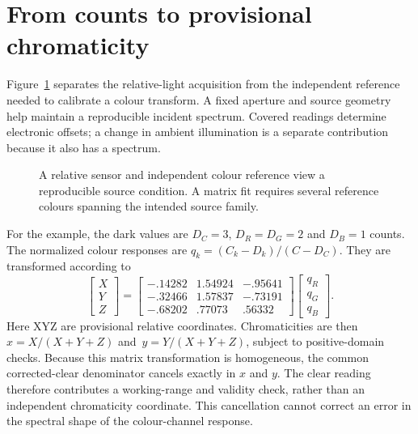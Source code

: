 \section{From counts to provisional chromaticity}
Figure~\ref{fig:colour-temperature-apparatus} separates the relative-light acquisition from the independent reference needed to calibrate a colour transform. A fixed aperture and source geometry help maintain a reproducible incident spectrum. Covered readings determine electronic offsets; a change in ambient illumination is a separate contribution because it also has a spectrum.

\begin{figure}[!htbp]
\centering
{}
\caption{A relative sensor and independent colour reference view a reproducible source condition. A matrix fit requires several reference colours spanning the intended source family.}
\label{fig:colour-temperature-apparatus}
\end{figure}

For the example, the dark values are $D_C=3$, $D_R=D_G=2$ and $D_B=1$ counts. The normalized colour responses are $q_k=(C_k-D_k)/(C-D_C)$. They are transformed according to
\begin{equation}
 \begin{bmatrix}X\\Y\\Z\end{bmatrix}
 =\begin{bmatrix}
 -.14282&1.54924&-.95641\\
 -.32466&1.57837&-.73191\\
 -.68202&.77073&.56332
 \end{bmatrix}
 \begin{bmatrix}q_R\\q_G\\q_B\end{bmatrix}.
 \label{eq:colour-temperature-matrix}
\end{equation}
Here XYZ are provisional relative coordinates. Chromaticities are then $x=X/(X+Y+Z)$ \mbox{and $y=Y/(X+Y+Z)$}, subject to positive-domain checks. Because this matrix transformation is homogeneous, the common corrected-clear denominator cancels exactly in $x$ and $y$. The clear reading therefore contributes a working-range and validity check, rather than an independent chromaticity coordinate. This cancellation cannot correct an error in the spectral shape of the colour-channel response.

